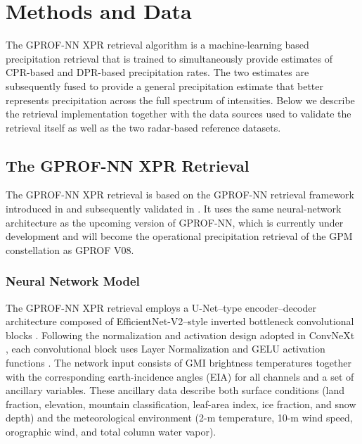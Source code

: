 \documentclass{ametsocV6.1}
\begin{document}
\section{Methods and Data}
\label{sec:methods}

The GPROF-NN XPR retrieval algorithm is a machine-learning based precipitation
retrieval that is trained to simultaneously provide estimates of CPR-based and
DPR-based precipitation rates. The two estimates are subsequently fused to
provide a general precipitation estimate that better represents precipitation
across the full spectrum of intensities. Below we describe the retrieval
implementation together with the data sources used to validate the retrieval
itself as well as the two radar-based reference datasets.


\subsection{The GPROF-NN XPR Retrieval}

The GPROF-NN XPR retrieval is based on the GPROF-NN retrieval framework
introduced in \citep{pfreundschuh_gprof-nn_2022} and subsequently validated in
\citep{pfreundschuh_gprof_2024}. It uses the same neural-network architecture as
the upcoming version of GPROF-NN, which is currently under development and will
become the operational precipitation retrieval of the GPM constellation as GPROF
V08.

\subsubsection*{Neural Network Model}

The GPROF-NN XPR retrieval employs a U-Net–type encoder–decoder architecture
composed of EfficientNet-V2–style inverted bottleneck convolutional blocks
\citep{tan2021efficientnetv2}. Following the normalization and activation design
adopted in ConvNeXt \citep{liu2022convnet}, each convolutional block uses Layer
Normalization \citep{ba2016layer} and GELU activation functions
\citep{hendrycks2016gaussian}. The network input consists of GMI brightness
temperatures together with the corresponding earth-incidence angles (EIA) for
all channels and a set of ancillary variables. These ancillary data describe
both surface conditions (land fraction, elevation, mountain classification,
leaf-area index, ice fraction, and snow depth) and the meteorological
environment (2-m temperature, 10-m wind speed, orographic wind, and total column
water vapor).
\end{document}

